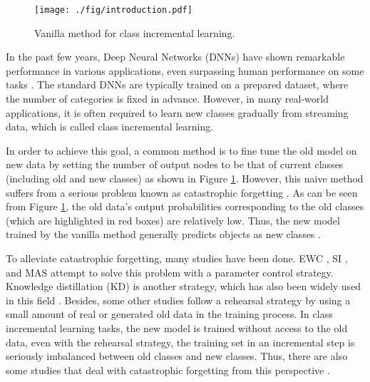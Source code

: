 \documentclass[10pt,twocolumn,letterpaper]{article}
\begin{document}
\begin{figure}[t]
  \centering
  \texttt{[image: ./fig/introduction.pdf]}
  \caption{Vanilla  method for class incremental learning.}
  \label{fig:introduction}
\end{figure}

In the past few years, Deep Neural Networks (DNNs) have shown remarkable performance in various applications, even surpassing human performance on some tasks \cite{He2015DeepRL,He2016IdentityMI,Huang2016DenselyCC}. The standard DNNs are typically trained on a prepared dataset, where the number of categories is fixed in advance. However, in many real-world applications, it is often required to learn new classes gradually from streaming data, which is called class incremental learning.

In order to achieve this goal, a common method is to fine tune the old model on new data by setting the number of output nodes to be that of current classes (including old and new classes) as shown in Figure \ref{fig:introduction}. However, this naive method suffers from a serious problem known as catastrophic forgetting \cite{French1999CatastrophicFI,MichaelCatastrophic}. As can be seen from Figure \ref{fig:introduction}, the old data's output probabilities corresponding to the old classes (which are highlighted in red boxes) are relatively low. Thus, the new model trained by the vanilla method generally predicts objects as new classes \cite{rebuffi2017icarl,wu2019large,Zhang2019LabelMN}.

To alleviate catastrophic forgetting, many studies have been done. EWC \cite{kirkpatrick2017overcoming}, SI \cite{zenke2017continual}, and MAS \cite{aljundi2018memory} attempt to solve this problem with a parameter control strategy. Knowledge distillation (KD) \cite{hinton2015distilling} is another strategy, which has also been widely used in this field \cite{castro2018end,li2017learning,zhou2019m2kd}. Besides, some other studies \cite{Nguyen2017VariationalCL,rebuffi2017icarl,shin2017continual,Wu2018IncrementalCL} follow a rehearsal strategy by using a small amount of real or generated old data in the training process. In class incremental learning tasks, the new model is trained without access to the old data, even with the rehearsal strategy, the training set in an incremental step is seriously imbalanced between old classes and new classes. Thus, there are also some studies that deal with catastrophic forgetting from this perspective \cite{hou2019learning,wu2019large}.
\end{document}
